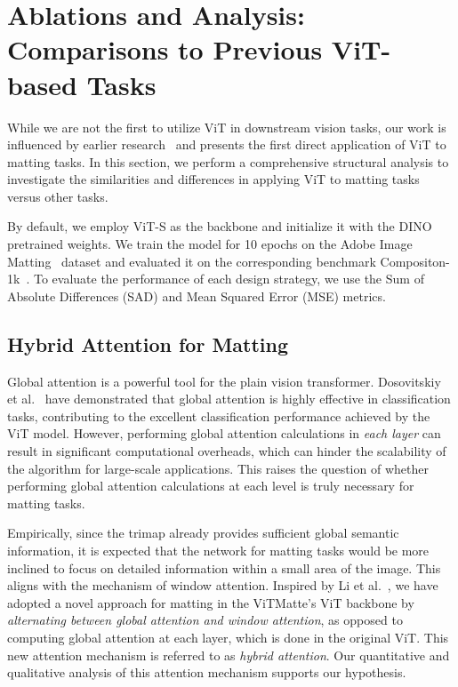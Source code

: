\documentclass[10pt,twocolumn,letterpaper]{article}
\newcommand{\thename}{ViTMatte}
\begin{document}
\section{Ablations and Analysis: Comparisons to Previous ViT-based Tasks}

While we are not the first to utilize ViT in downstream vision tasks, our work is influenced by earlier research~\cite{vitdet, vitpose, vitrs} and presents the first direct application of ViT to matting tasks. In this section, we perform a comprehensive structural analysis to investigate the similarities and differences in applying ViT to matting tasks versus other tasks.

By default, we employ ViT-S as the backbone and initialize it with the DINO~\cite{dino} pretrained weights. We train the model for 10 epochs on the Adobe Image Matting~\cite{DIM} dataset and evaluated it on the corresponding benchmark Compositon-1k~\cite{DIM}. To evaluate the performance of each design strategy, we use the Sum of Absolute Differences (SAD) and Mean Squared Error (MSE) metrics.

\subsection{Hybrid Attention for Matting}

Global attention is a powerful tool for the plain vision transformer. Dosovitskiy et al.~\cite{vit} have demonstrated that global attention is highly effective in classification tasks, contributing to the excellent classification performance achieved by the ViT model. However, performing global attention calculations in \emph{each layer} can result in significant computational overheads, which can hinder the scalability of the algorithm for large-scale applications. This raises the question of whether performing global attention calculations at each level is truly necessary for matting tasks.

Empirically, since the trimap already provides sufficient global semantic information, it is expected that the network for matting tasks would be more inclined to focus on detailed information within a small area of the image. This aligns with the mechanism of window attention. Inspired by Li et al.~\cite{vitdet}, we have adopted a novel approach for matting in the \thename{}'s ViT backbone by \emph{alternating between global attention and window attention}, as opposed to computing global attention at each layer, which is done in the original ViT. This new attention mechanism is referred to as \emph{hybrid attention}. Our quantitative and qualitative analysis of this attention mechanism supports our hypothesis.
\end{document}
